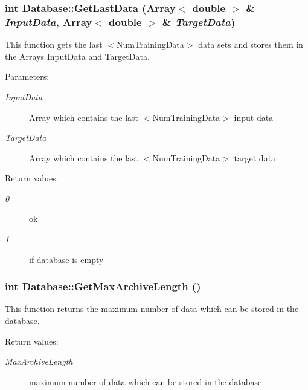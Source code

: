 \subsubsection{\setlength{\rightskip}{0pt plus 5cm}int Database::Get\-Last\-Data (Array$<$ double $>$ \& {\em Input\-Data}, Array$<$ double $>$ \& {\em Target\-Data})}\label{classDatabase_a5}


This function gets the last $<$Num\-Training\-Data$>$ data sets and stores them in the Arrays Input\-Data and Target\-Data.

\begin{Desc}
\item[Parameters: ]\par
\begin{description}
\item[{\em 
Input\-Data}]Array which contains the last $<$Num\-Training\-Data$>$ input data \item[{\em 
Target\-Data}]Array which contains the last $<$Num\-Training\-Data$>$ target data \end{description}
\end{Desc}
\begin{Desc}
\item[Return values: ]\par
\begin{description}
\item[{\em 
0}]ok \item[{\em 
1}]if database is empty \end{description}
\end{Desc}
\subsubsection{\setlength{\rightskip}{0pt plus 5cm}int Database::Get\-Max\-Archive\-Length ()}\label{classDatabase_a13}


This function returns the maximum number of data which can be stored in the database.

\begin{Desc}
\item[Return values: ]\par
\begin{description}
\item[{\em 
Max\-Archive\-Length}]maximum number of data which can be stored in the database \end{description}
\end{Desc}
